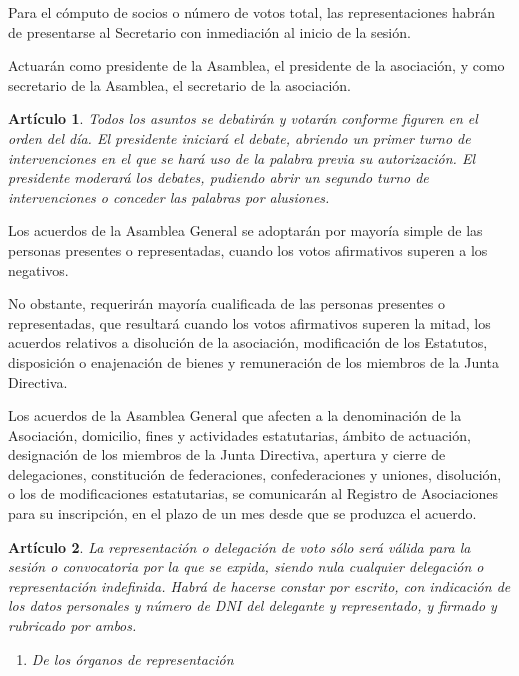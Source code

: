 \documentclass[a4paper,12pt]{article}
\theoremstyle{mystyle}		%
\newtheorem{art}{Artículo}	%
\begin{document}
\begin{onehalfspace}
Para el cómputo de socios o número de votos total, las representaciones habrán de presentarse al Secretario con inmediación al inicio de la sesión.

Actuarán como presidente de la Asamblea, el presidente de la asociación, y como secretario de la Asamblea, el secretario de la asociación.

\begin{art}
Todos los asuntos se debatirán y votarán conforme figuren en el orden del día. El presidente iniciará el debate, abriendo un primer turno de intervenciones en el que se hará uso de la palabra previa su autorización. El presidente moderará los debates, pudiendo abrir un segundo turno de intervenciones o conceder las palabras por alusiones.
\end{art}

Los acuerdos de la Asamblea General se adoptarán por mayoría simple de las personas presentes o representadas, cuando los votos afirmativos superen a los negativos.

No obstante, requerirán mayoría cualificada de las personas presentes o representadas, que resultará cuando los votos afirmativos superen la mitad, los acuerdos relativos a disolución de la asociación, modificación de los Estatutos, disposición o enajenación de bienes y remuneración de los miembros de la Junta Directiva.

Los acuerdos de la Asamblea General que afecten a la denominación de la Asociación, domicilio, fines y actividades estatutarias, ámbito de actuación, designación de los miembros de la Junta Directiva, apertura y cierre de delegaciones, constitución de federaciones, confederaciones y uniones, disolución, o los de modificaciones estatutarias, se comunicarán al Registro de Asociaciones para su inscripción, en el plazo de un mes desde que se produzca el acuerdo.

\begin{art}
La representación o delegación de voto sólo será válida para la sesión o convocatoria por la que se expida, siendo nula cualquier delegación o representación indefinida. Habrá de hacerse constar por escrito, con indicación de los datos personales y número de DNI del delegante y representado, y firmado y rubricado por ambos.
\end{art}

\begin{enumerate}[resume*=seccion]
 \item \textit{De los órganos de representación}
\end{enumerate}


\end{onehalfspace}
\end{document}
